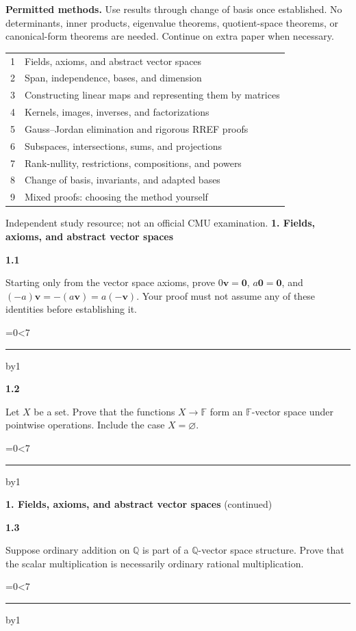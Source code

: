 \documentclass[11pt,letterpaper]{article}
\newcommand{\topicshort}{Problem collection}
\newcommand{\F}{\mathbb F}\newcommand{\R}{\mathbb R}\newcommand{\Q}{\mathbb Q}\newcommand{\C}{\mathbb C}\newcommand{\Z}{\mathbb Z}
\newcommand{\ruled}[1]{\par\begingroup\parskip=0pt\baselineskip=17pt\count255=0\loop\ifnum\count255<#1\noindent\textcolor{black!17}{\rule{\linewidth}{.25pt}}\par\advance\count255 by1\repeat\endgroup}
\newcommand{\problem}[4]{\noindent\begin{minipage}[t][3.48in][t]{\linewidth}\textbf{\color{navy}#1}\quad{\small\sffamily\color{teal}#2#3}\par #4\par\vfill\ruled{7}\end{minipage}}
\begin{document}
\textbf{Permitted methods.} Use results through change of basis once established. No determinants, inner products, eigenvalue theorems, quotient-space theorems, or canonical-form theorems are needed. Continue on extra paper when necessary.
\par\vspace{8pt}
\begin{tabular}{@{}rl@{}}\toprule
1 & Fields, axioms, and abstract vector spaces\\[4pt]
2 & Span, independence, bases, and dimension\\[4pt]
3 & Constructing linear maps and representing them by matrices\\[4pt]
4 & Kernels, images, inverses, and factorizations\\[4pt]
5 & Gauss--Jordan elimination and rigorous RREF proofs\\[4pt]
6 & Subspaces, intersections, sums, and projections\\[4pt]
7 & Rank-nullity, restrictions, compositions, and powers\\[4pt]
8 & Change of basis, invariants, and adapted bases\\[4pt]
9 & Mixed proofs: choosing the method yourself\\\bottomrule\end{tabular}
\vfill{\small Independent study resource; not an official CMU examination.}
\newpage
\renewcommand{\topicshort}{Axioms and abstraction}
{\large\bfseries\color{navy}1. Fields, axioms, and abstract vector spaces}\par\vspace{9pt}
\problem{1.1}{W}{}{Starting only from the vector space axioms, prove $0\mathbf v=\mathbf0$, $a\mathbf0=\mathbf0$, and $(-a)\mathbf v=-(a\mathbf v)=a(-\mathbf v)$. Your proof must not assume any of these identities before establishing it.}
\par\vspace{14pt}
\problem{1.2}{W}{}{Let $X$ be a set. Prove that the functions $X\to\F$ form an $\F$-vector space under pointwise operations. Include the case $X=\varnothing$.}
\newpage
\renewcommand{\topicshort}{Axioms and abstraction}
{\large\bfseries\color{navy}1. Fields, axioms, and abstract vector spaces} {\small(continued)}\par\vspace{9pt}
\problem{1.3}{M}{}{Suppose ordinary addition on $\Q$ is part of a $\Q$-vector space structure. Prove that the scalar multiplication is necessarily ordinary rational multiplication.}
\end{document}
